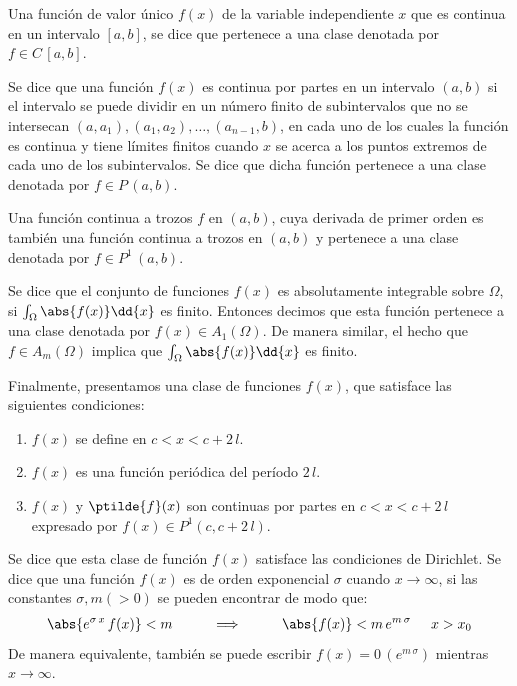 Una función de valor único $f (x)$ de la variable independiente $x$ que es continua en un intervalo $[a, b]$, se dice que pertenece a una clase denotada por $f \in C \, [a, b]$.
\par
Se dice que una función $f (x)$ es continua por partes en un intervalo $(a, b)$ si el intervalo se puede dividir en un número finito de subintervalos que no se intersecan $(a, a_{1}), (a_{1}, a_{2}), \ldots, (a_{n -1}, b)$, en cada uno de los cuales la función es continua y tiene límites finitos cuando $x$ se acerca a los puntos extremos de cada uno de los subintervalos. Se dice que dicha función pertenece a una clase denotada por $f \in P \, (a, b)$.
\par
Una función continua a trozos $f$ en $(a, b)$, cuya derivada de primer orden es también una función continua a trozos en $(a, b)$ y pertenece a una clase denotada por $f \in P^{1} \, (a, b)$.
\par
Se dice que el conjunto de funciones $f (x)$ es absolutamente integrable sobre $\Omega$, si $\int_{\Omega}  \abs{f (x)} \dd{x}$ es finito. Entonces decimos que esta función pertenece a una clase denotada por $f (x) \in A_{1} (\Omega)$. De manera similar, el hecho que $f \in A_{m} (\Omega)$ implica que $\int_{\Omega}  \abs{f (x)} \dd{x}$ es finito.
\par
Finalmente, presentamos una clase de funciones $f (x)$, que satisface las siguientes condiciones:
\begin{enumerate}[label=\roman*]
\item $f (x)$ se define en $c < x < c + 2 \, l$.
\item $f (x)$ es una función periódica del período $2 \, l$.
\item $f (x)$ y $\ptilde{f} (x)$ son continuas por partes en $c  < x <c + 2 \, l$ expresado por $f (x) \in P^{1} (c, c + 2 \, l)$.
\end{enumerate}
Se dice que esta clase de función $f (x)$ satisface las condiciones de Dirichlet. Se dice que una función $f (x)$ es de orden exponencial $\sigma$ cuando $x \to \infty$, si las constantes $\sigma, m (> 0)$ se pueden encontrar de modo que:
\begin{align*}
\abs{ e^{\sigma \, x} \, f(x)} < m \hspace{1cm} \Longrightarrow \hspace{1cm} \abs{f(x)} < m \, e^{m \, \sigma} \hspace{0.5cm} x > x_{0}
\end{align*}
De manera equivalente, también se puede escribir $f (x) = 0 \, (e^{m \, \sigma})$ mientras $x \to \infty$.

